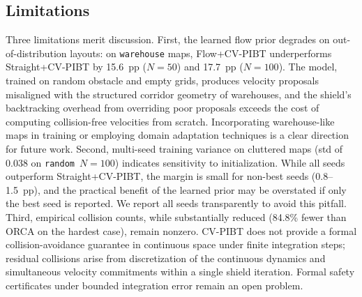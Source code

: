 \subsection{Limitations}\label{sec:limitations}

Three limitations merit discussion.
First, the learned flow prior degrades on out-of-distribution
layouts: on \texttt{warehouse} maps, Flow+CV-PIBT
underperforms Straight+CV-PIBT by 15.6~pp ($N\!=\!50$)
and 17.7~pp ($N\!=\!100$).
The model, trained on random obstacle and empty grids,
produces velocity proposals misaligned with the structured
corridor geometry of warehouses, and the shield's backtracking
overhead from overriding poor proposals exceeds the cost
of computing collision-free velocities from scratch.
Incorporating warehouse-like maps in training or employing
domain adaptation techniques is a clear direction for
future work.
Second, multi-seed training variance on cluttered maps
(std of 0.038 on \texttt{random}~$N\!=\!100$) indicates
sensitivity to initialization.
While all seeds outperform Straight+CV-PIBT, the margin
is small for non-best seeds (0.8--1.5~pp), and the practical
benefit of the learned prior may be overstated if only the
best seed is reported.
We report all seeds transparently to avoid this pitfall.
Third, empirical collision counts, while substantially
reduced (84.8\% fewer than ORCA on the hardest case), remain
nonzero.
CV-PIBT does not provide a formal collision-avoidance
guarantee in continuous space under finite integration steps;
residual collisions arise from discretization of the
continuous dynamics and simultaneous velocity commitments
within a single shield iteration.
Formal safety certificates under bounded integration error
remain an open problem.



